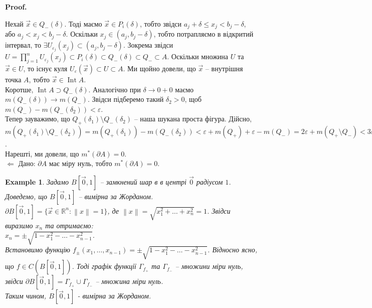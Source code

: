 \documentclass[a4paper, 10pt]{article}
\makeatletter
\def\qed{$\blacksquare$}
\def\leftproof{$\boxed{\Leftarrow}$ }
\theoremstyle{theoremdd}
\theoremstyle{theoremdd}
\theoremstyle{theoremdd}
\theoremstyle{theoremdd}
\theoremstyle{theoremdd}
\newtheorem{example}[theorem]{Example}
\theoremstyle{theoremdd}
\theoremstyle{theoremdd}
\theoremstyle{theoremdd}
\theoremstyle{theoremdd}
\theoremstyle{theoremdd}
\theoremstyle{theoremdd}
\theoremstyle{theoremdd}
\theoremstyle{theoremdd}
\theoremstyle{theoremdd}
\theoremstyle{theoremdd}
\renewenvironment{proof}[1][Proof.\\]{\par
\pushQED{\hfill \qed}%
\normalfont \topsep6\p@\@plus6\p@\relax
\trivlist
\item\relax
{\bfseries
#1\@addpunct{.}}\hspace\labelsep\ignorespaces
}{%
\popQED\endtrivlist\@endpefalse
}
\newcommand\Norm[1]{\left\lVert#1\right\rVert}
\DeclareMathOperator{\Int}{Int}
\makeatother
\begin{document}
\begin{proof}
Нехай $\vec{x} \in Q_-(\delta)$. Тоді маємо $\vec{x} \in P_i(\delta)$, тобто звідси $a_j + \delta \leq x_j < b_j - \delta$, або $a_j < x_j < b_j - \delta$. Оскільки $x_j \in (a_j,b_j-\delta)$, тобто потрапляємо в відкритий інтервал, то $\exists U_{\varepsilon_j}(x_j) \subset (a_j,b_j-\delta)$. Зокрема звідси $U = \displaystyle\prod_{j=1}^n U_{\varepsilon_j}(x_j) \subset P_i(\delta) \subset Q_-(\delta) \subset Q_- \subset A$. Оскільки множина $U$ та $\vec{x} \in U$, то існує куля $U_{\varepsilon}(\vec{x}) \subset U \subset A$. Ми щойно довели, що $\vec{x}$ -- внутрішня точка $A$, тобто $\vec{x} \in \Int A$.\\
Коротше, $\Int A \supset Q_-(\delta)$. Аналогічно при $\delta \to 0+0$ маємо $m(Q_-(\delta)) \to m(Q_-)$. Звідси підберемо такий $\delta_2 > 0$, щоб $m(Q_-) - m(Q_-(\delta_2)) < \varepsilon$.\\
Тепер зауважимо, що $Q_+(\delta_1) \setminus Q_-(\delta_2)$ -- наша шукана проста фігура. Дійсно,\\
$m(Q_+(\delta_1) \setminus Q_-(\delta_2)) = m(Q_+(\delta_1)) - m(Q_-(\delta_2)) < \varepsilon + m(Q_+) + \varepsilon - m(Q_-) = 2 \varepsilon + m(Q_+ \setminus Q_-) < 3 \varepsilon$.\\
Нарешті, ми довели, що $m^*(\partial A) = 0$.
\bigskip \\
\leftproof Дано: $\partial A$ має міру нуль, тобто $m^*(\partial A) = 0$.
\iffalse
Розглянемо множину $Q_+^n = \displaystyle\bigsqcup_i P_i^n$, де кожний $P_i^n$ був побудований із $P_i$ шляхом зменшення лівого кінця та збільшення правого кінця на $\dfrac{1}{n}$ (тобто було $[a,b)$ та стало $\left[a-\dfrac{1}{n},b+\dfrac{1}{n}\right)$). Зауважимо, що $m(Q_+^n) \to m(Q_+)$ при $n \to \infty$. Тобто знайдеться номер $N$ так, що $m(Q_+^N) - m(Q_+) < \varepsilon$.
\fi
\end{proof}

\begin{example}
Задамо $B[\vec{0},1]$ -- замкнений шар в в центрі $\vec{0}$ радіусом $1$. Доведемо, що $B[\vec{0},1]$ -- вимірна за Жорданом.\\
$\partial B[\vec{0},1] = \{ \vec{x} \in \mathbb{R}^n: \Norm{x} = 1 \}$, де $\Norm{x} = \sqrt{x_1^2+\dots+x_n^2} = 1$. Звідси виразимо $x_n$ та отримаємо:\\
$x_n = \pm \sqrt{1-x_1^2-\dots-x_{n-1}^2}$.\\
Встановимо функцію $f_{\pm}(x_1,\dots,x_{n-1}) = \pm \sqrt{1-x_1^2-\dots-x_{n-1}^2}$. Відносно ясно, що $f \in C(B[\vec{0},1])$. Тоді графік функції $\Gamma_{f_+}$ та $\Gamma_{f_-}$ -- множини міри нуль, звідси $\partial B[\vec{0},1] = \Gamma_{f_+} \cup \Gamma_{f_-}$ -- множина міри нуль.\\
Таким чином, $B[\vec{0},1]$ - вимірна за Жорданом.
\end{example}
\end{document}
